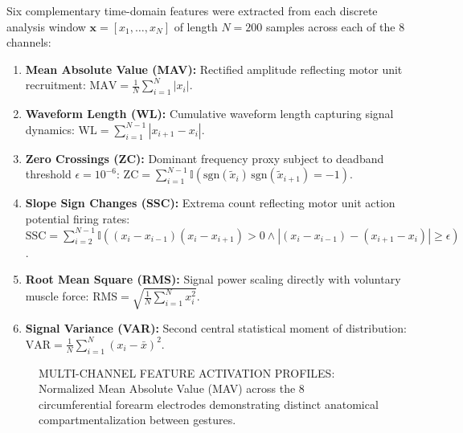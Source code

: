 \documentclass[12pt,a4paper]{article}
\begin{document}
Six complementary time-domain features were extracted from each discrete analysis window $\mathbf{x} = [x_1, \dots, x_N]$ of length $N = 200$ samples across each of the 8 channels:
\begin{enumerate}[leftmargin=*]
    \item \textbf{Mean Absolute Value (MAV):} Rectified amplitude reflecting motor unit recruitment: $\text{MAV} = \frac{1}{N} \sum_{i=1}^{N} |x_i|$.
    \item \textbf{Waveform Length (WL):} Cumulative waveform length capturing signal dynamics: $\text{WL} = \sum_{i=1}^{N-1} |x_{i+1} - x_i|$.
    \item \textbf{Zero Crossings (ZC):} Dominant frequency proxy subject to deadband threshold $\epsilon = 10^{-6}$: $\text{ZC} = \sum_{i=1}^{N-1} \mathbb{I}(\text{sgn}(\tilde{x}_i)\,\text{sgn}(\tilde{x}_{i+1}) = -1)$.
    \item \textbf{Slope Sign Changes (SSC):} Extrema count reflecting motor unit action potential firing rates: $\text{SSC} = \sum_{i=2}^{N-1} \mathbb{I}((x_i - x_{i-1})(x_i - x_{i+1}) > 0 \land |(x_i - x_{i-1}) - (x_{i+1} - x_i)| \ge \epsilon)$.
    \item \textbf{Root Mean Square (RMS):} Signal power scaling directly with voluntary muscle force: $\text{RMS} = \sqrt{\frac{1}{N} \sum_{i=1}^{N} x_i^2}$.
    \item \textbf{Signal Variance (VAR):} Second central statistical moment of distribution: $\text{VAR} = \frac{1}{N} \sum_{i=1}^{N} (x_i - \bar{x})^2$.
\end{enumerate}

\begin{figure}[htbp]
\centering
{}
\caption{MULTI-CHANNEL FEATURE ACTIVATION PROFILES: Normalized Mean Absolute Value (MAV) across the 8 circumferential forearm electrodes demonstrating distinct anatomical compartmentalization between gestures.}
\label{fig:feature_activation_profiles}
\end{figure}
\end{document}
